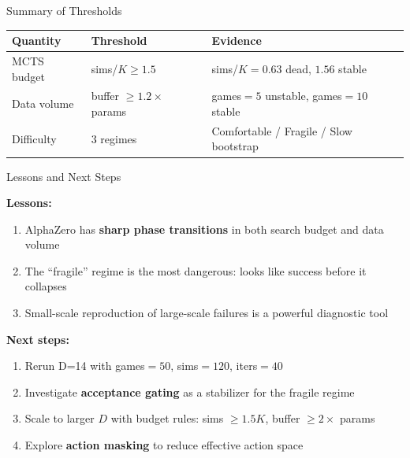 \documentclass[aspectratio=169, 10pt]{beamer}
\begin{document}
\begin{frame}{Summary of Thresholds}

\centering
\begin{tabular}{lll}
\toprule
\textbf{Quantity} & \textbf{Threshold} & \textbf{Evidence} \\
\midrule
MCTS budget    & sims/$K \geq 1.5$         & sims/$K{=}0.63$ dead, $1.56$ stable \\[0.3cm]
Data volume    & buffer $\geq 1.2\times$ params & games$=5$ unstable, games$=10$ stable \\[0.3cm]
Difficulty     & 3 regimes                 & Comfortable / Fragile / Slow bootstrap \\
\bottomrule
\end{tabular}

\vspace{0.7cm}
\begin{center}
\end{center}
\end{frame}

\begin{frame}{Lessons and Next Steps}

\textbf{Lessons:}
\begin{enumerate}
  \item AlphaZero has \textbf{sharp phase transitions} in both search budget and data volume
  \item The ``fragile'' regime is the most dangerous: \alert{looks like success before it collapses}
  \item Small-scale reproduction of large-scale failures is a powerful diagnostic tool
\end{enumerate}

\vspace{0.5cm}
\textbf{Next steps:}
\begin{enumerate}
  \item Rerun D=14 with games$=50$, sims$=120$, iters$=40$
  \item Investigate \textbf{acceptance gating} as a stabilizer for the fragile regime
  \item Scale to larger $D$ with budget rules: sims $\geq 1.5K$, buffer $\geq 2\times$ params
  \item Explore \textbf{action masking} to reduce effective action space
\end{enumerate}
\end{frame}
\end{document}
